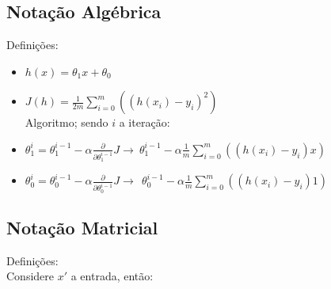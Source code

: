 \documentclass[a4paper, 12pt]{article}
\begin{document}
\subsection{Notação Algébrica}

Definições:
\begin{itemize}
    \item $h(x)=\theta_1x+\theta_0$
    \item $J(h)=\frac{1}{2m}\sum\limits_{i=0}^{m}((h(x_i)-y_i)^2)$\\

    Algoritmo; sendo $i$ a iteração:

    \item $ \theta^i_1= \theta_1^{i-1} - \alpha \frac{\partial}{\partial \theta_1^{i-1}}J \to ~
     \theta_1^{i-1} - \alpha \frac{1}{m}\sum\limits_{i=0}^{m}((h(x_i)-y_i)x)$
    \item $ \theta^i_0= \theta_0^{i-1} - \alpha \frac{\partial}{\partial \theta_0^{i-1}}J \to ~
    \ \theta_0^{i-1} - \alpha \frac{1}{m}\sum\limits_{i=0}^{m}((h(x_i)-y_i)1)$
    
\end{itemize}

\subsection{Notação Matricial}

Definições:\\ 

Considere $x'$ a entrada, então:
\end{document}

